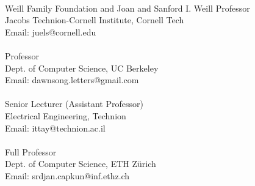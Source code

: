  \\
Weill Family Foundation and Joan and Sanford I. Weill Professor \\
Jacobs Technion-Cornell Institute, Cornell Tech \\
Email: juels@cornell.edu \\[2mm]
%
 \\
Professor\\
Dept. of Computer Science, UC Berkeley \\
Email: dawnsong.letters@gmail.com \\[2mm]
%
 \\
Senior Lecturer (Assistant Professor) \\
Electrical Engineering, Technion \\
Email: ittay@technion.ac.il \\[2mm]
%
 \\
Full Professor \\
Dept. of Computer Science, ETH Z\"urich \\
Email: srdjan.capkun@inf.ethz.ch \\[2mm]


